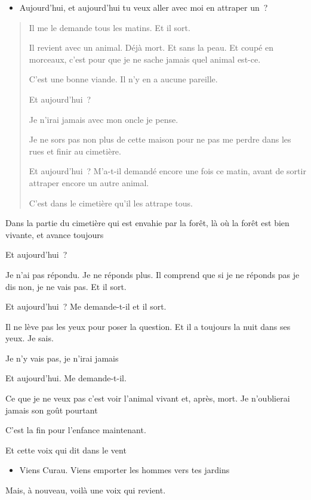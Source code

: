\begin{itemize}
\item
  Aujourd'hui, et aujourd'hui tu veux aller avec moi en attraper un~?
\end{itemize}

\begin{quote}
Il me le demande tous les matins. Et il sort.

Il revient avec un animal. Déjà mort. Et sans la peau. Et coupé en
morceaux, c'est pour que je ne sache jamais quel animal est-ce.

C'est une bonne viande. Il n'y en a aucune pareille.

Et aujourd'hui~?

Je n'irai jamais avec mon oncle je pense.

Je ne sors pas non plus de cette maison pour ne pas me perdre dans les
rues et finir au cimetière.

Et aujourd'hui~? M'a-t-il demandé encore une fois ce matin, avant de
sortir attraper encore un autre animal.

C'est dans le cimetière qu'il les attrape tous.
\end{quote}

Dans la partie du cimetière qui est envahie par la forêt, là où la forêt
est bien vivante, et avance toujours

Et aujourd'hui~?

Je n'ai pas répondu. Je ne réponds plus. Il comprend que si je ne
réponds pas je dis non, je ne vais pas. Et il sort.

Et aujourd'hui~? Me demande-t-il et il sort.

Il ne lève pas les yeux pour poser la question. Et il a toujours la nuit
dans ses yeux. Je sais.

Je n'y vais pas, je n'irai jamais

Et aujourd'hui. Me demande-t-il.

Ce que je ne veux pas c'est voir l'animal vivant et, après, mort. Je
n'oublierai jamais son goût pourtant

C'est la fin pour l'enfance maintenant.

Et cette voix qui dit dans le vent

\begin{itemize}
\item
  Viens Curau. Viens emporter les hommes vers tes jardins
\end{itemize}

Mais, à nouveau, voilà une voix qui revient.


